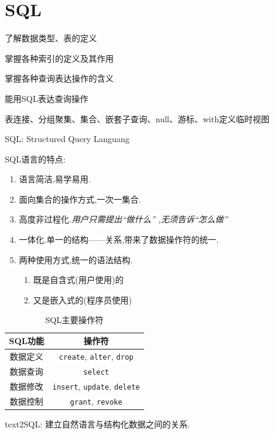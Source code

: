 \chapter{SQL}

\begin{introduction}[期末考试提纲]
  \item 了解数据类型、表的定义
  \item 掌握各种索引的定义及其作用
  \item 掌握各种查询表达操作的含义
  \item 能用SQL表达查询操作
  \item 表连接、分组聚集、集合、嵌套子查询、null、游标、with定义临时视图
\end{introduction}

SQL: Structured Query Languang

SQL语言的特点:
\begin{enumerate}
    \item 语言简洁,易学易用.
    \item 面向集合的操作方式,一次一集合.
    \item 高度非过程化.\textit{用户只需提出“做什么” ,无须告诉“怎么做”}
    \item 一体化.单一的结构——关系,带来了数据操作符的统一.
    \item 两种使用方式,统一的语法结构.
    \begin{enumerate}
        \item 既是自含式(用户使用)的
        \item 又是嵌入式的(程序员使用)
    \end{enumerate}
\end{enumerate}

\begin{table}[H]
  \centering
  \begin{tabular}{|c|c|}
    \hline
    \textbf{SQL功能} & \textbf{操作符} \\
    \hline
    数据定义 & \verb|create|, \verb|alter|, \verb|drop| \\
    \hline
    数据查询 & \verb|select| \\
    \hline
    数据修改 & \verb|insert|, \verb|update|, \verb|delete| \\
    \hline
    数据控制 & \verb|grant|, \verb|revoke| \\
    \hline
  \end{tabular}
  \caption{SQL主要操作符}
\end{table}

text2SQL: 建立自然语言与结构化数据之间的关系.


